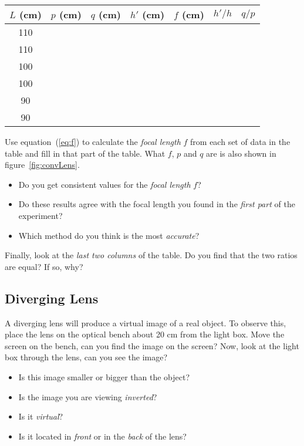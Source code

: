 \documentclass[11pt, a4paper]{article}
\begin{document}
\begin{center}
    \def\arraystretch{1.5}
    \setlength\tabcolsep{0.6cm}
    \begin{tabular}{|c|c|c|c|c|c|c|}
        \hline
        \rowcolor{gray!40}
        $L$ (cm) & $p$ (cm) & $q$ (cm) & $h'$ (cm) & $f$ (cm) & $h'/h$ & $q/p$ \\
        \hline
        110 & ~ & ~ & ~ & ~ & ~ & ~ \\
        \hline
        110 & ~ & ~ & ~ & ~ & ~ & ~ \\
        \hline
        100 & ~ & ~ & ~ & ~ & ~ & ~ \\
        \hline
        100 & ~ & ~ & ~ & ~ & ~ & ~ \\
        \hline
        90 & ~ & ~ & ~ & ~ & ~ & ~ \\
        \hline
        90 & ~ & ~ & ~ & ~ & ~ & ~ \\
        \hline
    \end{tabular}
\end{center}

Use equation~(\ref{eq:f}) to calculate the \textit{focal length} $f$ from each set of data in the table
and fill in that part of the table.
What $f$, $p$ and $q$ are is also shown in figure~\ref{fig:convLens}.
\begin{itemize}
    \item Do you get consistent values for the \textit{focal length} $f$?
    \item Do these results agree with the focal length you found in the \textit{first part} of the experiment?
    \item Which method do you think is the most \textit{accurate}?
\end{itemize}
\fillwithlines{3cm}
Finally, look at the \textit{last two columns} of the table.
Do you find that the two ratios are equal?
If so, why?
\fillwithlines{3cm}
\subsection{Diverging Lens}
A diverging lens will produce a virtual image of a real object. 
To observe this, place the lens on the optical bench about 20 cm from the light
box.
Move the screen on the bench, can you find the image on the screen?
Now, look at the light box through the lens, can you see the image?
\begin{itemize}
    \item Is this image smaller or bigger than the object?
    \item Is the image you are viewing \textit{inverted}?
    \item Is it \textit{virtual}?
    \item Is it located in \textit{front} or in the \textit{back} of the lens?
\end{itemize}
\fillwithlines{3cm}
\end{document}
